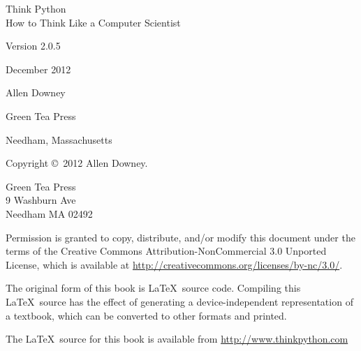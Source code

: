 \documentclass[10pt]{book}
\newcommand{\theversion}{2.0.5}
\newcommand{\thedate}{December 2012}
\begin{document}
\begin{CJK}{UTF8}{gbsn}
\begin{latexonly}
\begin{flushright}
\vspace*{2.0in}

\begin{spacing}{3}
{\huge Think Python}\\
{\Large How to Think Like a Computer Scientist}
\end{spacing}

\vspace{0.25in}

Version \theversion

\thedate

\vspace{1in}


{\Large
Allen Downey\\
}


\vspace{0.5in}

{\Large Green Tea Press}

{\small Needham, Massachusetts}

\vfill

\end{flushright}


\pagebreak
\thispagestyle{empty}

{\small
Copyright \copyright ~2012 Allen Downey.


\vspace{0.2in}

\begin{flushleft}
Green Tea Press       \\
9 Washburn Ave        \\
Needham MA 02492
\end{flushleft}

Permission is granted to copy, distribute, and/or modify this document
under the terms of the Creative Commons Attribution-NonCommercial 3.0 Unported
License, which is available at \url{http://creativecommons.org/licenses/by-nc/3.0/}.

The original form of this book is \LaTeX\ source code.  Compiling this
\LaTeX\ source has the effect of generating a device-independent
representation of a textbook, which can be converted to other formats
and printed.

The \LaTeX\ source for this book is available from
\url{http://www.thinkpython.com}

\vspace{0.2in}

}
\end{latexonly}
\end{CJK}
\end{document}
